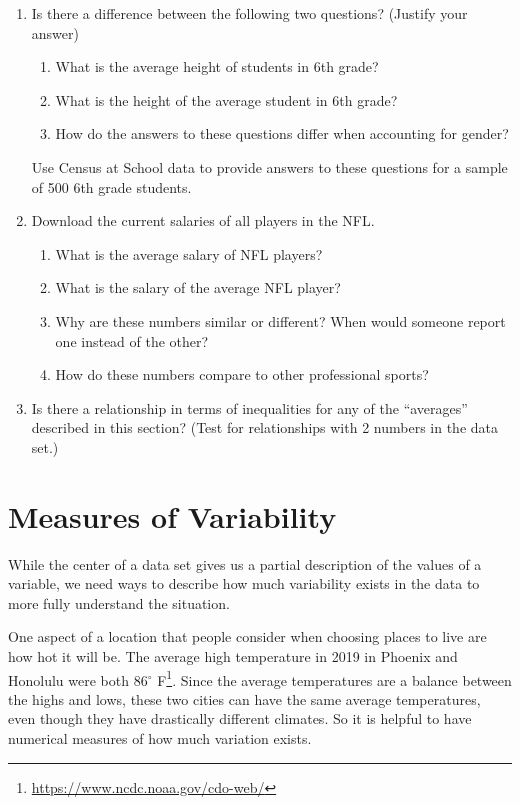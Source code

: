 \documentclass[
]{book}
\providecommand{\tightlist}{%
  \setlength{\itemsep}{0pt}\setlength{\parskip}{0pt}}
\let\stdsection\section
\renewcommand\section{\newpage\stdsection}
\theoremstyle{definition}
\theoremstyle{definition}
\theoremstyle{definition}
\theoremstyle{definition}
\theoremstyle{remark}
\begin{document}
\begin{enumerate}
\def\labelenumi{\arabic{enumi}.}
\item
  Is there a difference between the following two questions? (Justify your answer)

  \begin{enumerate}
  \def\labelenumii{\alph{enumii}.}
  \tightlist
  \item
    What is the average height of students in 6th grade?
  \item
    What is the height of the average student in 6th grade?
  \item
    How do the answers to these questions differ when accounting for gender?
  \end{enumerate}

  Use Census at School data to provide answers to these questions for a sample of 500 6th grade students.
\item
  Download the current salaries of all players in the NFL.

  \begin{enumerate}
  \def\labelenumii{\alph{enumii}.}
  \tightlist
  \item
    What is the average salary of NFL players?
  \item
    What is the salary of the average NFL player?
  \item
    Why are these numbers similar or different? When would someone report one instead of the other?
  \item
    How do these numbers compare to other professional sports?
  \end{enumerate}
\item
  Is there a relationship in terms of inequalities for any of the ``averages'' described in this section? (Test for relationships with 2 numbers in the data set.)
\end{enumerate}

\hypertarget{measures-of-variability}{%
\section{Measures of Variability}\label{measures-of-variability}}

While the center of a data set gives us a partial description of the values of a variable, we need ways to describe how much variability exists in the data to more fully understand the situation.

One aspect of a location that people consider when choosing places to live are how hot it will be. The average high temperature in 2019 in Phoenix and Honolulu were both 86\(^\circ\) F\footnote{\url{https://www.ncdc.noaa.gov/cdo-web/}}.
Since the average temperatures are a balance between the highs and lows, these two cities can have the same average temperatures, even though they have drastically different climates. So it is helpful to have numerical measures of how much variation exists.
\end{document}
